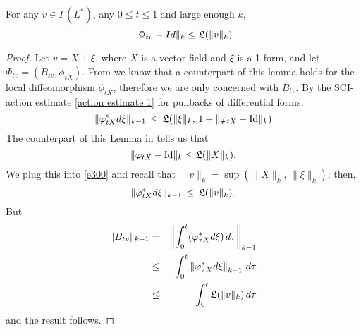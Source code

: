 \documentclass{article}
\begin{document}
\begin{lem}\label{flow estimate}
For any $v \in \Gamma(L^*)$, any $0\leq t\leq1$ and large enough $k$,
$$\|\Phi_{tv} - Id\|_k \leq \mathfrak{L}(\|v\|_k)$$
\end{lem}
\begin{proof}
Let $v = X+\xi$, where $X$ is a vector field and $\xi$ is a 1-form, and let $\Phi_{tv} = (B_{tv},\phi_{tX})$.  From \cite{MirandaMonnierZung} we know that a counterpart of this lemma holds for the local diffeomorphism $\phi_{tX}$, therefore we are only concerned with $B_{tv}$. By the SCI-action estimate \eqref{action estimate 1} for pullbacks of differential forms,
\begin{equation}\label{e300}
\|\phi_{tX}^* d\xi\|_{k-1} \,\leq\, \LP(\|\xi\|_k,\, 1+\|\phi_{tX}-\Id\|_k)
\end{equation}
The counterpart of this Lemma in \cite{MirandaMonnierZung} tells us that
$$\|\varphi_{tX}-\textrm{Id}\|_k \leq \mathfrak{L}(\|X\|_k).$$
We plug this into \eqref{e300} and recall that $\|v\|_k = \sup(\|X\|_k,\,\|\xi\|_k)$; then,
$$\|\varphi^*_{tX} d\xi\|_{k-1} \,\leq\, \mathfrak{L}(\|v\|_k).$$
But
\begin{eqnarray*}
\|B_{tv}\|_{k-1} &=& \left\| \int_0^t (\varphi^*_{\tau X} d\xi)\, d\tau\right\|_{k-1} \\
&\leq& \int_0^t \left\|\varphi^*_{\tau X} d\xi\right\|_{k-1}\, d\tau \\
&\leq& \int_0^t \mathfrak{L}(\|v\|_k)\, d\tau
\end{eqnarray*}
and the result follows.
\end{proof}
\end{document}
